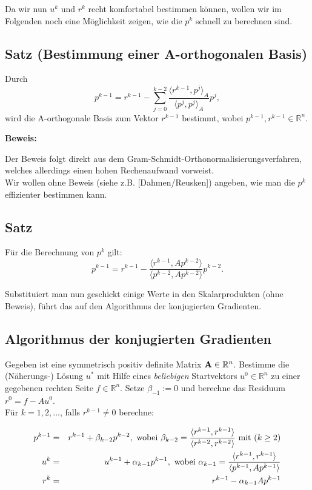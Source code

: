 Da wir nun $u^{k}$ und $r^{k}$ recht komfortabel bestimmen können, wollen wir im Folgenden noch eine Möglichkeit zeigen, wie die $p^{k}$ schnell zu berechnen sind.

\subsection{Satz (Bestimmung einer A-orthogonalen Basis)}
Durch
\begin{equation}
p^{k-1} = r^{k-1} - \sum_{j=0}^{k-2} \frac {\langle r^{k-1}, p^{j} \rangle _{A}} {\langle p^{j}, p^{j} \rangle _{A}} p^{j},
\end{equation}
wird die A-orthogonale Basis zum Vektor $r^{k-1}$ bestimmt, wobei $p^{k-1},r^{k-1} \in \mathbb{R}^{n}$.

\textbf{Beweis:}

Der Beweis folgt direkt aus dem Gram-Schmidt-Orthonormalisierungsverfahren, welches allerdings einen hohen Rechenaufwand vorweist.\\
Wir wollen ohne Beweis (siehe z.B. [Dahmen/Reusken]) angeben, wie man die $p^{k}$ effizienter bestimmen kann.

\subsection{Satz}
Für die Berechnung von $p^{k}$ gilt:
\begin{equation}
p^{k-1} = r^{k-1} - \frac {\langle r^{k-1}, Ap^{k-2} \rangle} {\langle p^{k-2}, Ap^{k-2} \rangle} p^{k-2}.
\end{equation}

Substituiert man nun geschickt einige Werte in den Skalarprodukten (ohne Beweis), führt das auf den Algorithmus der konjugierten Gradienten.

\subsection{Algorithmus der konjugierten Gradienten}\label{ss.Numerisches CG}

Gegeben ist eine symmetrisch positiv definite Matrix ${\textbf{A}} \in \mathbb{R}^{n}$. Bestimme die (Näherungs-) Lösung $u^{*}$ mit Hilfe eines \textit{beliebigen} Startvektors $u^{0} \in \mathbb{R}^{n}$ zu einer gegebenen rechten Seite $f \in \mathbb{R}^{n}$. Setze $\beta_{-1} := 0$ und berechne das Residuum $r^{0} = f - Au^{0}$. \\
Für $k = 1,2,...$, falls $r^{k-1} \ne 0$ berechne:

\begin{eqnarray}
p^{k-1} &=& r^{k-1} + \beta_{k-2}p^{k-2}, \textnormal{ wobei } \beta_{k-2} = \frac {\langle r^{k-1}, r^{k-1} \rangle} {\langle r^{k-2}, r^{k-2} \rangle} \textnormal{ mit } (k \ge 2) \notag \\
u^{k} &=& u^{k-1} + \alpha_{k-1}p^{k-1}, \textnormal{ wobei } \alpha_{k-1} = \frac {\langle r^{k-1}, r^{k-1} \rangle} {\langle p^{k-1}, Ap^{k-1} \rangle} \notag \\
r^{k} &=& r^{k-1} - \alpha_{k-1}Ap^{k-1} \notag
\end{eqnarray}

